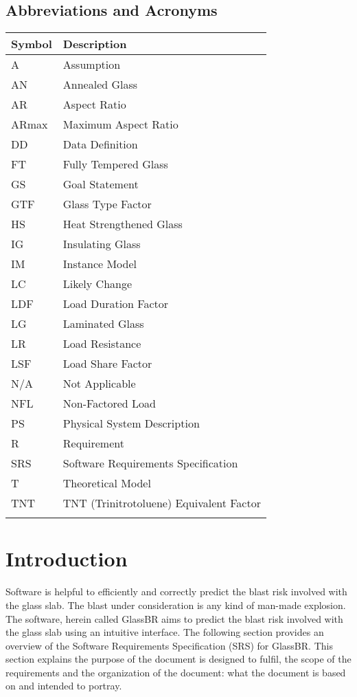 \documentclass[12pt]{article}
\begin{document}
\subsection{Abbreviations and Acronyms}
\label{Sec:AaA}
\begin{longtable*}{l l}
\toprule
Symbol & Description
\\
\midrule
A & Assumption
\\
AN & Annealed Glass
\\
AR & Aspect Ratio
\\
ARmax & Maximum Aspect Ratio
\\
DD & Data Definition
\\
FT & Fully Tempered Glass
\\
GS & Goal Statement
\\
GTF & Glass Type Factor
\\
HS & Heat Strengthened Glass
\\
IG & Insulating Glass
\\
IM & Instance Model
\\
LC & Likely Change
\\
LDF & Load Duration Factor
\\
LG & Laminated Glass
\\
LR & Load Resistance
\\
LSF & Load Share Factor
\\
N/A & Not Applicable
\\
NFL & Non-Factored Load
\\
PS & Physical System Description
\\
R & Requirement
\\
SRS & Software Requirements Specification
\\
T & Theoretical Model
\\
TNT & TNT (Trinitrotoluene) Equivalent Factor
\\
\bottomrule
\label{Table:AaA}
\end{longtable*}
\section{Introduction}
\label{Sec:I}
Software is helpful to efficiently and correctly predict the blast risk involved with the glass slab. The blast under consideration is any kind of man-made explosion. The software, herein called GlassBR aims to predict the blast risk involved with the glass slab using an intuitive interface. The following section provides an overview of the Software Requirements Specification (SRS) for GlassBR. This section explains the purpose of the document is designed to fulfil, the scope of the requirements and the organization of the document: what the document is based on and intended to portray.
\end{document}
